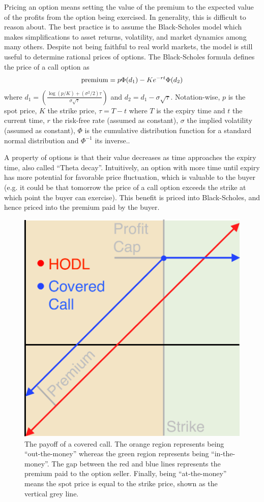 \documentclass[hidelinks, 12pt]{article}
\begin{document}
Pricing an option means setting the value of the premium to the expected value of the profits from the option being exercised. In generality, this is difficult to  reason about. The best practice is to assume the  Black-Scholes model which makes simplifications to asset returns, volatility, and market dynamics among many others. Despite not being faithful to real world markets, the model is still useful to determine rational prices of options. The Black-Scholes formula defines the price of a call option as
\[\textup{premium} = p \Phi(d_1) - K e^{-rt} \Phi(d_2)\]
where $d_1 = \left( \frac{\log(p/K) + (\sigma^2/2)\tau}{\sigma\sqrt{\tau}}\right)$ and $d_2 = d_1 - \sigma\sqrt{\tau}$. Notation-wise, $p$ is the spot price, $K$ the strike price, $\tau = T-t$ where $T$ is the expiry time and $t$ the current time, $r$ the risk-free rate (assumed as constant), $\sigma$ the implied volatility (assumed as constant), $\Phi$ is the cumulative distribution function for a standard normal distribution and $\Phi^{-1}$ its inverse..

A property of options is that their value decreases as time approaches the expiry time, also called ``Theta decay''. Intuitively, an option with more time until expiry has more potential for favorable price fluctuation, which is valuable to the buyer (e.g. it could be that tomorrow the price of a call option exceeds the strike at which point the buyer can exercise). This benefit is priced into Black-Scholes, and hence priced into the premium paid by the buyer.

\begin{figure}[h!]
    \centering
    \includegraphics[width=0.5\linewidth]{coveredcall.pdf}
    \caption{The payoff of a covered call. The orange  region represents being ``out-the-money'' whereas the green region represents being ``in-the-money''. The gap between the red and blue lines represents the premium paid to the option seller. Finally, being ``at-the-money'' means the spot price is equal to the strike price, shown as the vertical grey line.}
    \label{fig:covercall}
\end{figure}
\end{document}
